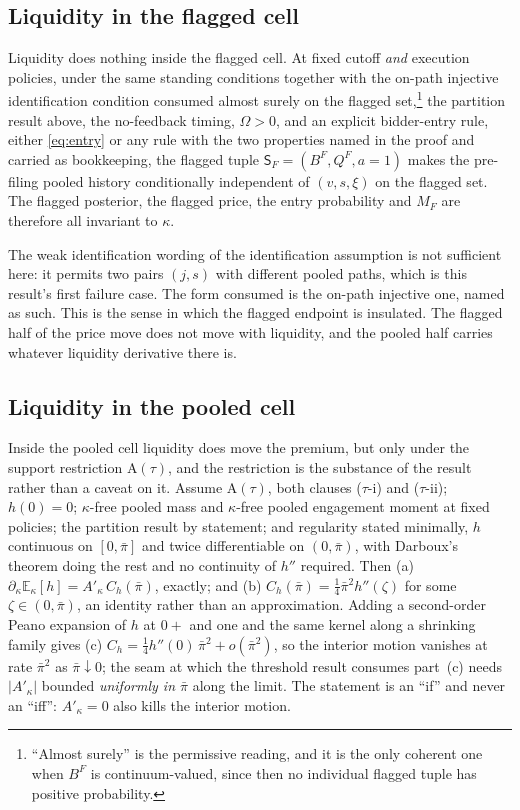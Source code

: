 \documentclass[11pt]{article}
\makeatletter
\newcommand{\compatlabel}[2]{\begingroup\phantomsection\def\@currentlabel{#1}\label{#2}\endgroup}
\newcommand{\Eop}{\mathbb{E}}
\newcommand{\Atau}{\mathrm{A}(\tau)}
\newcommand{\Akap}{A'_{\kappa}}
\newcommand{\Sfl}{\mathsf{S}_F}
\makeatother
\begin{document}
\subsection{Liquidity in the flagged cell}
\label{sec:flagged-results}

Liquidity does nothing inside the flagged cell. At fixed cutoff \emph{and} execution policies, under
the same standing conditions together with the on-path injective identification condition consumed
almost surely on the flagged set,\footnote{``Almost surely'' is the permissive reading, and it is
the only coherent one when $B^F$ is continuum-valued, since then no individual flagged tuple has
positive probability.} the partition result above, the no-feedback timing, $\Omega>0$, and an
explicit bidder-entry rule, either \eqref{eq:entry} or any rule with the two properties named in
the proof and carried as bookkeeping, the flagged tuple $\Sfl=(B^F,Q^F,a{=}1)$ makes the pre-filing
pooled history conditionally independent of $(v,s,\xi)$ on the flagged set. The flagged posterior,
the flagged price, the entry probability and $M_F$ are therefore all invariant to
$\kappa$.\compatlabel{3}{lem:L2}

The weak identification wording of the identification assumption is not sufficient here: it permits
two pairs $(j,s)$ with different pooled paths, which is this result's first failure case. The form
consumed is the on-path injective one, named as such. This is the sense in which the flagged
endpoint is insulated. The flagged half of the price move does not move with liquidity, and the
pooled half carries whatever liquidity derivative there is.

\subsection{Liquidity in the pooled cell}
\label{sec:pooled-results}

Inside the pooled cell liquidity does move the premium, but only under the support restriction
$\Atau$, and the restriction is the substance of the result rather than a caveat on it. Assume
$\Atau$, both clauses ($\tau$-i) and ($\tau$-ii); $h(0)=0$; $\kappa$-free pooled mass and
$\kappa$-free pooled engagement moment at fixed policies; the partition result by statement; and
regularity stated minimally, $h$ continuous on $[0,\bar\pi]$ and twice differentiable on
$(0,\bar\pi)$, with Darboux's theorem doing the rest and no continuity of $h''$ required. Then
(a) $\partial_\kappa\Eop_\kappa[h]=\Akap\,C_h(\bar\pi)$, exactly; and (b)
$C_h(\bar\pi)=\tfrac14\bar\pi^2h''(\zeta)$ for some $\zeta\in(0,\bar\pi)$, an identity rather than an
approximation. Adding a second-order Peano expansion of $h$ at $0+$ and one and the same kernel along
a shrinking family gives (c) $C_h=\tfrac14h''(0)\,\bar\pi^2+o(\bar\pi^2)$, so the interior motion
vanishes at rate $\bar\pi^2$ as $\bar\pi\downarrow0$; the seam at which the threshold result consumes
part~(c) needs $|\Akap|$ bounded \emph{uniformly in $\bar\pi$} along the limit. The statement is an
``if'' and never an ``iff'': $\Akap=0$ also kills the interior motion.\compatlabel{4}{lem:L3}
\end{document}
